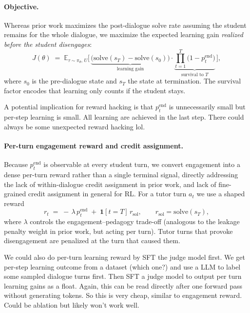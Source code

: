 \documentclass[11pt]{article}
\begin{document}
\paragraph{Objective.} Whereas prior work maximizes the post-dialogue solve rate
assuming the student remains for the whole dialogue, we maximize the expected
learning gain \emph{realized before the student disengages}:
\begin{equation}
  J(\theta) \;=\; \mathbb{E}_{\tau \sim \pi_\theta,\, U}\Big[\,
      \underbrace{\big(\mathrm{solve}(s_T) - \mathrm{solve}(s_0)\big)}_{\text{learning gain}}
      \cdot \underbrace{\textstyle\prod_{t=1}^{T}\big(1 - p^{\text{end}}_t\big)}_{\text{survival to } T}
   \,\Big],
   \label{eq:objective}
\end{equation}
where $s_0$ is the pre-dialogue state and $s_T$ the state at termination. The
survival factor encodes that learning only counts if the student stays. 

A potential implication for reward hacking is that $p^{\text{end}}_t$ is unnecessarily small but per-step learning is small. All learning are achieved in the last step. There could always be some unexpected reward hacking lol.

\paragraph{Per-turn engagement reward and credit assignment.} Because
$p^{\text{end}}_t$ is observable at every student turn, we convert engagement into
a dense per-turn reward rather than a single terminal signal, directly addressing
the lack of within-dialogue credit assignment in prior work, and lack of fine-grained credit assignment in general for RL. 
For a tutor turn
$a_t$ we use a shaped reward
\begin{equation}
  r_t \;=\; -\,\lambda\, p^{\text{end}}_{t} \;+\; \mathbf{1}[t = T]\, r_{\text{sol}},
  \qquad r_{\text{sol}} = \mathrm{solve}(s_T),
  \label{eq:per-turn-reward}
\end{equation}
where $\lambda$ controls the engagement--pedagogy trade-off (analogous to the
leakage penalty weight in prior work, but acting per turn). Tutor turns that
provoke disengagement are penalized at the turn that caused them.

We could also do per-turn learning reward by SFT the judge model first. We get per-step learning outcome from a dataset (which one?) and use a LLM to label some sampled dialogue turns first. Then SFT a judge model to output per turn learning gains as a float. Again, this can be read directly after one forward pass without generating tokens. So this is very cheap, similar to engagement reward. Could be ablation but likely won't work well.
\end{document}
